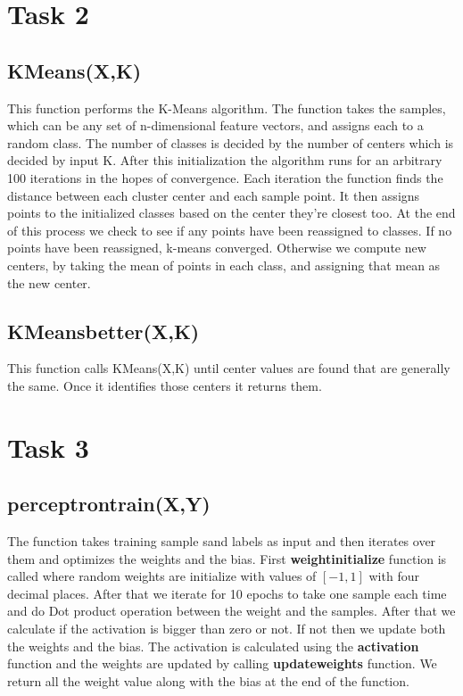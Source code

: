 \documentclass[12pt]{report}
\begin{document}
{\section{Task 2}
\subsection{K\textunderscore Means(X,K)}
This function performs the K-Means algorithm. The function takes the samples, which can be any set of n-dimensional feature vectors, and assigns each to a random class. The number of classes is decided by the number of centers which is decided by input K. After this initialization the algorithm runs for an arbitrary 100 iterations in the hopes of convergence. Each iteration the function finds the distance between each cluster center and each sample point. It then assigns points to the initialized classes based on the center they're closest too. At the end of this process we check to see if any points have been reassigned to classes. If no points have been reassigned, k-means converged. Otherwise we compute new centers, by taking the mean of points in each class, and assigning that mean as the new center.
\subsection{K\textunderscore Means\textunderscore better(X,K)}
This function calls K\textunderscore Means(X,K) until center values are found that are generally the same. Once it identifies those centers it returns them.

\section{Task 3}
\subsection{perceptron\textunderscore train(X,Y)}
The function takes training sample sand labels as input and then iterates over them and optimizes the weights and the bias. First \textbf{weight\textunderscore initialize} function is called where random weights are initialize with values of $[-1,1]$ with four decimal places. After that we iterate for 10 epochs to take one sample each time and do Dot product operation between the weight and the samples. After that we calculate if the activation is bigger than zero or not. If not then we update both the weights and the bias. The activation is calculated using the \textbf{activation} function and the weights are updated by calling \textbf{update\textunderscore weights} function. We return all the weight value along with the bias at the end of the function. 


}
\end{document}
